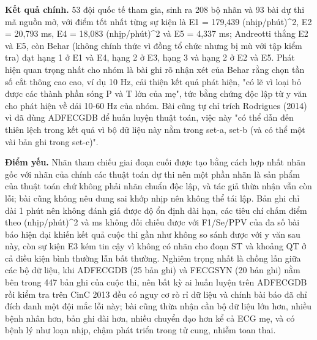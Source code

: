 \documentclass[12pt,a4paper]{article}
\begin{document}
\noindent \textbf{Kết quả chính.} 53 đội quốc tế tham gia, sinh ra 208 bộ nhãn và 93 bài dự thi mã nguồn mở, với điểm tốt nhất từng sự kiện là E1 = 179,439 (nhịp/phút)\textasciicircum{}2, E2 = 20,793 ms, E4 = 18,083 (nhịp/phút)\textasciicircum{}2 và E5 = 4,337 ms; Andreotti thắng E2 và E5, còn Behar (không chính thức vì đồng tổ chức nhưng bị mù với tập kiểm tra) đạt hạng 1 ở E1 và E4, hạng 2 ở E3, hạng 3 và hạng 2 ở E2 và E5. Phát hiện quan trọng nhất cho nhóm là bài ghi rõ nhận xét của Behar rằng chọn tần số cắt thông cao cao, ví dụ 10 Hz, cải thiện kết quả phát hiện, "có lẽ vì loại bỏ được các thành phần sóng P và T lớn của mẹ", tức bằng chứng độc lập từ y văn cho phát hiện về dải 10-60 Hz của nhóm. Bài cũng tự chỉ trích Rodrigues (2014) vì đã dùng ADFECGDB để huấn luyện thuật toán, việc này "có thể dẫn đến thiên lệch trong kết quả vì bộ dữ liệu này nằm trong set-a, set-b (và có thể một vài bản ghi trong set-c)".\par\vspace{3pt}
\noindent \textbf{Điểm yếu.} Nhãn tham chiếu giai đoạn cuối được tạo bằng cách hợp nhất nhãn gốc với nhãn của chính các thuật toán dự thi nên một phần nhãn là sản phẩm của thuật toán chứ không phải nhãn chuẩn độc lập, và tác giả thừa nhận vẫn còn lỗi; bài cũng không nêu dung sai khớp nhịp nên không thể tái lập. Bản ghi chỉ dài 1 phút nên không đánh giá được độ ổn định dài hạn, các tiêu chí chấm điểm theo (nhịp/phút)\textasciicircum{}2 và ms không đối chiếu được với F1/Se/PPV của đa số bài báo hiện đại khiến kết quả cuộc thi gần như không so sánh được với y văn sau này, còn sự kiện E3 kém tin cậy vì không có nhãn cho đoạn ST và khoảng QT ở cả điều kiện bình thường lẫn bất thường. Nghiêm trọng nhất là chồng lấn giữa các bộ dữ liệu, khi ADFECGDB (25 bản ghi) và FECGSYN (20 bản ghi) nằm bên trong 447 bản ghi của cuộc thi, nên bất kỳ ai huấn luyện trên ADFECGDB rồi kiểm tra trên CinC 2013 đều có nguy cơ rò rỉ dữ liệu và chính bài báo đã chỉ đích danh một đội mắc lỗi này; bài cũng thừa nhận cần bộ dữ liệu lớn hơn, nhiều bệnh nhân hơn, bản ghi dài hơn, nhiều chuyển đạo hơn kể cả ECG mẹ, và có bệnh lý như loạn nhịp, chậm phát triển trong tử cung, nhiễm toan thai.\par\vspace{3pt}
\end{document}
